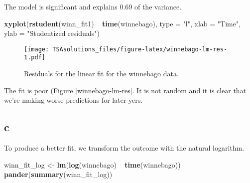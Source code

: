 \documentclass[]{book}
\newenvironment{Shaded}{\begin{snugshade}}{\end{snugshade}}
\newcommand{\KeywordTok}[1]{\textcolor[rgb]{0.13,0.29,0.53}{\textbf{{#1}}}}
\newcommand{\DataTypeTok}[1]{\textcolor[rgb]{0.13,0.29,0.53}{{#1}}}
\newcommand{\StringTok}[1]{\textcolor[rgb]{0.31,0.60,0.02}{{#1}}}
\newcommand{\NormalTok}[1]{{#1}}
\theoremstyle{definition}
\theoremstyle{definition}
\theoremstyle{remark}
\begin{document}
The model is significant and explains 0.69 of the variance.

\begin{Shaded}
\begin{Highlighting}[]
\KeywordTok{xyplot}\NormalTok{(}\KeywordTok{rstudent}\NormalTok{(winn_fit1) ~}\StringTok{ }\KeywordTok{time}\NormalTok{(winnebago), }\DataTypeTok{type =} \StringTok{"l"}\NormalTok{,}
       \DataTypeTok{xlab =} \StringTok{"Time"}\NormalTok{, }\DataTypeTok{ylab =} \StringTok{"Studentized residuals"}\NormalTok{)}
\end{Highlighting}
\end{Shaded}

\begin{figure}[htbp]
\centering
\texttt{[image: TSAsolutions\_files/figure-latex/winnebago-lm-res-1.pdf]}
\caption{\label{fig:winnebago-lm-res}Residuals for the linear fit for the
winnebago data.}
\end{figure}

The fit is poor (Figure \ref{winnebago-lm-res}. It is not random and it
is clear that we're making worse predictions for later yers.

\subsection*{c}\label{c-13}

To produce a better fit, we transform the outcome with the natural
logarithm.

\begin{Shaded}
\begin{Highlighting}[]
\NormalTok{winn_fit_log <-}\StringTok{ }\KeywordTok{lm}\NormalTok{(}\KeywordTok{log}\NormalTok{(winnebago) ~}\StringTok{ }\KeywordTok{time}\NormalTok{(winnebago))}
\KeywordTok{pander}\NormalTok{(}\KeywordTok{summary}\NormalTok{(winn_fit_log))}
\end{Highlighting}
\end{Shaded}
\end{document}
